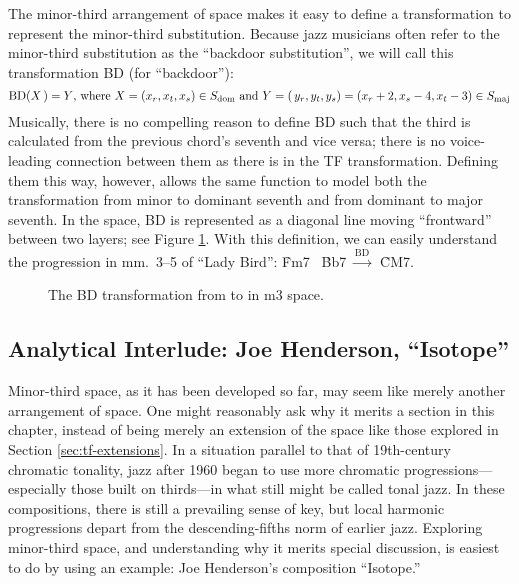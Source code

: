 The minor-third arrangement of \tf space makes it easy to define a
transformation to represent the minor-third substitution. Because jazz
musicians often refer to the minor-third substitution as the ``backdoor
substitution'',  we will call this transformation BD (for ``backdoor''):%
%
\begin{displaymath}
    \mathrm{BD}(X\,) = Y\text{, where}\ X = (x_r, x_t, x_s) \in S_{\mathrm{dom}}
    \text{ and}\
    Y = (\,y_r, y_t, y_s) = (x_r + 2, x_s - 4, x_t - 3) \in S_{\mathrm{maj}}
\end{displaymath}%
%
Musically, there is no compelling reason to define BD such that the third is
calculated from the previous chord's seventh and vice versa; there is no
voice-leading connection between them as there is in the TF transformation.
Defining them this way, however, allows the same function to model both the
transformation from minor to dominant seventh and from dominant to major
seventh.\fn{mts-4} In the space, BD is represented as a diagonal line moving
``frontward'' between two layers; see Figure \ref{mts:bd-transformation}. With
this definition, we can easily understand the progression in mm.~3--5 of
``Lady Bird'': \h{Fm7} \TFarrow\ \h{Bb7} $\xrightarrow{\mathrm{BD}}$\ \h{CM7}.

\begin{figure}[tbp]
  \caption[The BD transformation in m3 space.]{The BD transformation from
    \caph{Bb7} to \caph{CM7} in m3 space.}
  \label{mts:bd-transformation}
\end{figure}

\subsection{Analytical Interlude: Joe Henderson, “Isotope”}
\label{sec:henderson-isotope}
\FloatBarrier

Minor-third space, as it has been developed so far, may seem like merely
another arrangement of \tf space. One might reasonably ask why it merits a
section in this chapter, instead of being merely an extension of the space
like those explored in Section \ref{sec:tf-extensions}. In a situation
parallel to that of 19th-century chromatic tonality, jazz after 1960 began to
use more chromatic progressions---\allowbreak especially those built on
thirds---in what still might be called tonal jazz. In these compositions, there
is still a prevailing sense of key, but local harmonic progressions depart
from the descending-fifths norm of earlier jazz.\fn{mts-5} Exploring
minor-third space, and understanding why it merits special discussion, is
easiest to do by using an example: Joe Henderson's composition
``Isotope.''

